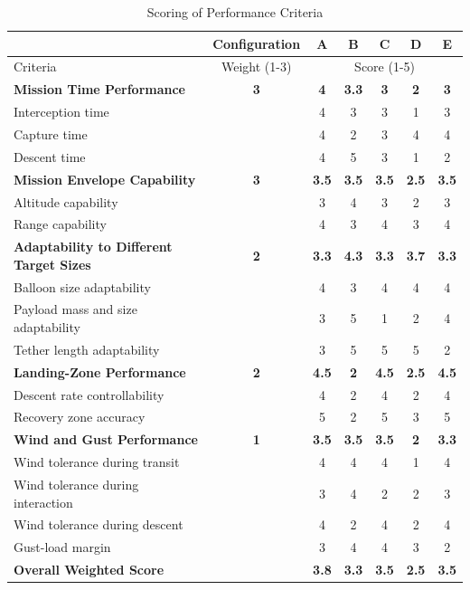 \iffalse

\begin{table}[H]
    \centering
    \caption{Scoring of Performance Criteria}
    \begin{tabular}{lc|ccccc}
    \hline
         & Configuration & A & B & C & D & E \\ \hline
        Criteria & Weight (1-3)& \multicolumn{5}{c}{Score (1-5)} \\ \hline

        \textbf{Mission Time Performance} & \textbf{3}& \textbf{4}& \textbf{3.3}& \textbf{3}& \textbf{2}&\textbf{3} \\
        \quad Interception time && 4&3 &3 &1 &3  \\
        \quad Capture time && 4& 2& 3& 4& 4 \\
        \quad Descent time && 4& 5& 3& 1& 2 \\ \hline

        \textbf{Mission Envelope Capability} & \textbf{3}& \textbf{3.5} & \textbf{3.5}& \textbf{3.5}&\textbf{2.5} &\textbf{3.5} \\
        \quad Altitude capability && 3& 4& 3& 2&3 \\
        \quad Range capability && 4& 3& 4& 3& 4 \\ \hline

        \textbf{Adaptability to Different Target Sizes} & \textbf{2}& \textbf{3.3}& \textbf{4.3}& \textbf{3.3}& \textbf{3.7}& \textbf{3.3}\\
        \quad Balloon size adaptability & & 4&3 & 4 & 4&4 \\
        \quad Payload mass and size adaptability & & 3&5 &1 & 2&4 \\
        \quad Tether length adaptability & &3 & 5& 5& 5&2 \\ \hline

        \textbf{Landing-Zone Performance} &\textbf{2} & \textbf{4.5}& \textbf{2} & \textbf{4.5}& \textbf{2.5}& \textbf{4.5}\\
        \quad Descent rate controllability & & 4 & 2& 4& 2& 4 \\
        \quad Recovery zone accuracy & & 5& 2& 5& 3&5 \\ \hline

        \textbf{Wind and Gust Performance} & \textbf{1}&\textbf{3.5} & \textbf{3.5}& \textbf{3.5}& \textbf{2}& \textbf{3.3}\\
        \quad Wind tolerance during transit & & 4& 4& 4& 1& 4\\
        \quad Wind tolerance during interaction & & 3& 4& 2& 2& 3\\
        \quad Wind tolerance during descent & &4 & 2&4 & 2&4 \\
        \quad Gust-load margin & & 3& 4& 4& 3&2 \\ \hline

        \textbf{Overall Weighted Score} & &\textbf{3.8} & \textbf{3.3} & \textbf{3.5}&\textbf{2.5} &\textbf{3.5} \\ \hline
    \end{tabular}
    \label{tab:performance-criteria-scoring}
\end{table}


